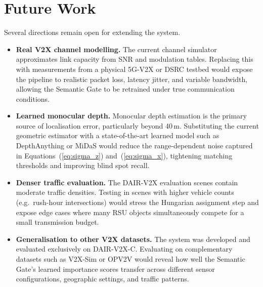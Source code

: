 \documentclass[12pt]{article}
\begin{document}
\section{Future Work}
 
Several directions remain open for extending the system.
 
\begin{itemize}
    \item \textbf{Real V2X channel modelling.}  The current channel
    simulator approximates link capacity from SNR and modulation tables.
    Replacing this with measurements from a physical 5G-V2X or DSRC
    testbed would expose the pipeline to realistic packet loss, latency
    jitter, and variable bandwidth, allowing the Semantic Gate to be
    retrained under true communication conditions.
 
    \item \textbf{Learned monocular depth.}  Monocular depth estimation
    is the primary source of localisation error, particularly beyond
    40\,m.  Substituting the current geometric estimator with a
    state-of-the-art learned model such as DepthAnything or MiDaS would
    reduce the range-dependent noise captured in
    Equations~(\ref{eq:sigma_z}) and~(\ref{eq:sigma_x}), tightening
    matching thresholds and improving blind spot recall.
 
    \item \textbf{Denser traffic evaluation.}  The DAIR-V2X evaluation
    scenes contain moderate traffic densities.  Testing in scenes with
    higher vehicle counts (e.g.\ rush-hour intersections) would stress
    the Hungarian assignment step and expose edge cases where many RSU
    objects simultaneously compete for a small transmission budget.
 
    \item \textbf{Generalisation to other V2X datasets.}  The system
    was developed and evaluated exclusively on DAIR-V2X-C.  Evaluating
    on complementary datasets such as V2X-Sim or OPV2V would reveal
    how well the Semantic Gate's learned importance scores transfer
    across different sensor configurations, geographic settings, and
    traffic patterns.
\end{itemize}
\printbibliography[title={References}]
\end{document}
